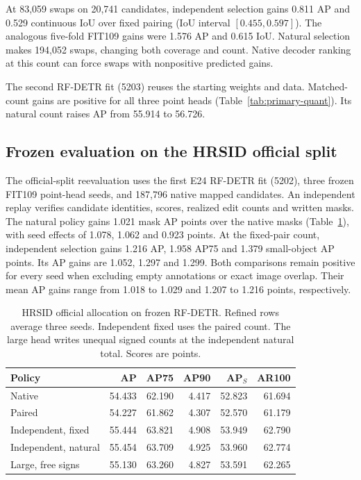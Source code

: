\documentclass[journal]{IEEEtran}
\begin{document}
At 83,059 swaps on 20,741 candidates, independent selection gains 0.811 AP and 0.529 continuous IoU over fixed pairing (IoU interval \([0.455,0.597]\)). The analogous five-fold FIT109 gains were 1.576 AP and 0.615 IoU. Natural selection makes 194,052 swaps, changing both coverage and count. Native decoder ranking at this count can force swaps with nonpositive predicted gains.

The second RF-DETR fit (5203) reuses the starting weights and data. Matched-count gains are positive for all three point heads (Table~\ref{tab:primary-quant}). Its natural count raises AP from 55.914 to 56.726.

\subsection{Frozen evaluation on the HRSID official split}
The official-split reevaluation uses the first E24 RF-DETR fit (5202), three frozen FIT109 point-head seeds, and 187,796 native mapped candidates. An independent replay verifies candidate identities, scores, realized edit counts and written masks. The natural policy gains 1.021 mask AP points over the native masks (Table~\ref{tab:official}), with seed effects of 1.078, 1.062 and 0.923 points. At the fixed-pair count, independent selection gains 1.216 AP, 1.958 AP75 and 1.379 small-object AP points. Its AP gains are 1.052, 1.297 and 1.299. Both comparisons remain positive for every seed when excluding empty annotations or exact image overlap. Their mean AP gains range from 1.018 to 1.029 and 1.207 to 1.216 points, respectively.

\begin{table}[t]
\centering
\caption{HRSID official allocation on frozen RF-DETR. Refined rows average three seeds. Independent fixed uses the paired count. The large head writes unequal signed counts at the independent natural total. Scores are points.}
\label{tab:official}
\footnotesize
\setlength{\tabcolsep}{3.5pt}
\begin{tabular}{@{}lrrrrr@{}}
\toprule
Policy & AP & AP75 & AP90 & AP$_{S}$ & AR100\\
\midrule
Native & 54.433 & 62.190 & 4.417 & 52.823 & 61.694\\
Paired & 54.227 & 61.862 & 4.307 & 52.570 & 61.179\\
Independent, fixed & 55.444 & 63.821 & 4.908 & 53.949 & 62.790\\
Independent, natural & 55.454 & 63.709 & 4.925 & 53.960 & 62.774\\
Large, free signs & 55.130 & 63.260 & 4.827 & 53.591 & 62.265\\
\bottomrule
\end{tabular}
\end{table}
\end{document}
